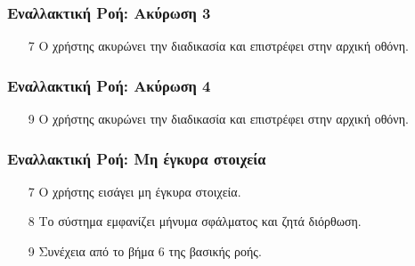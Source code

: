 \subsubsection{Εναλλακτική Ροή: Ακύρωση 3}

\begin{enumerate}
    \item[7] Ο χρήστης ακυρώνει την διαδικασία και επιστρέφει στην αρχική οθόνη.
\end{enumerate}

\subsubsection{Εναλλακτική Ροή: Ακύρωση 4}

\begin{enumerate}
    \item[9] Ο χρήστης ακυρώνει την διαδικασία και επιστρέφει στην αρχική οθόνη.
\end{enumerate}

\subsubsection{Εναλλακτική Ροή: Μη έγκυρα στοιχεία}

\begin{enumerate}
    \item[7] Ο χρήστης εισάγει μη έγκυρα στοιχεία.
    \item[8] Το σύστημα εμφανίζει μήνυμα σφάλματος και ζητά διόρθωση.
    \item[9] Συνέχεια από το βήμα 6 της βασικής ροής.
\end{enumerate}
